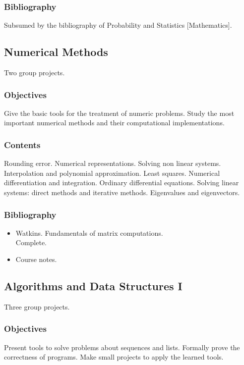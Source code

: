 \documentclass[spanish]{article}
\begin{document}
\subsubsection{Bibliography}
Subsumed by the bibliography of Probability and Statistics [Mathematics].


\hrulefill%

\subsection{Numerical Methods}
Two group projects.

\subsubsection{Objectives}
Give the basic tools for the treatment of numeric problems. Study
the most important numerical methods and their computational implementations.

\subsubsection{Contents}
Rounding error. Numerical representations. Solving non linear systems.
Interpolation and polynomial approximation. Least squares. Numerical
differentiation and integration. Ordinary differential equations. Solving
linear systems: direct methods and iterative methods. Eigenvalues and eigenvectors.

\subsubsection{Bibliography}
\begin{itemize}
  \item Watkins. Fundamentals of matrix computations.\\
    Complete.
  \item Course notes.
\end{itemize}


\hrulefill%

\subsection{Algorithms and Data Structures I}
Three group projects.

\subsubsection{Objectives}
Present tools to solve problems about sequences and lists. Formally prove
the correctness of programs. Make small projects to apply the learned
tools.
\end{document}

